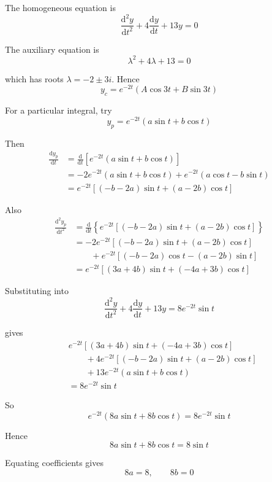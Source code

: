 \documentclass[leqno]{article}
\begin{document}
\begin{enumerate}[
  label=\textbf{\arabic*.},
  leftmargin=*,
  topsep=0pt,
  partopsep=0pt,
  parsep=0pt
]
\vspace*{10pt}

\begin{djsSolution}
The homogeneous equation is
\[
\frac{\mathrm{d}^2 y}{\mathrm{d}t^2}+4\frac{\mathrm{d}y}{\mathrm{d}t}+13y=0
\]

The auxiliary equation is
\[
\lambda^2+4\lambda+13=0
\]

which has roots $\lambda=-2\pm 3i$. Hence
\[
y_c=e^{-2t}\left(A\cos 3t+B\sin 3t\right)
\]

For a particular integral, try
\[
y_p=e^{-2t}\left(a\sin t+b\cos t\right)
\]

Then
\begin{align*}
\frac{\mathrm{d}y_p}{\mathrm{d}t}
&= \frac{\mathrm{d}}{\mathrm{d}t}\left[e^{-2t}\left(a\sin t+b\cos t\right)\right] \\
&= -2e^{-2t}\left(a\sin t+b\cos t\right)
+e^{-2t}\left(a\cos t-b\sin t\right) \\
&= e^{-2t}\left[(-b-2a)\sin t+(a-2b)\cos t\right]
\end{align*}

Also
\begin{align*}
\frac{\mathrm{d}^2y_p}{\mathrm{d}t^2}
&= \frac{\mathrm{d}}{\mathrm{d}t}\left\{e^{-2t}\left[(-b-2a)\sin t+(a-2b)\cos t\right]\right\} \\
&= -2e^{-2t}\left[(-b-2a)\sin t+(a-2b)\cos t\right] \\
&\qquad +e^{-2t}\left[(-b-2a)\cos t-(a-2b)\sin t\right] \\
&= e^{-2t}\left[(3a+4b)\sin t+(-4a+3b)\cos t\right]
\end{align*}

Substituting into
\[
\frac{\mathrm{d}^2 y}{\mathrm{d}t^2}+4\frac{\mathrm{d}y}{\mathrm{d}t}+13y=8e^{-2t}\sin t
\]

gives
\begin{align*}
& e^{-2t}\left[(3a+4b)\sin t+(-4a+3b)\cos t\right] \\
& \qquad +4e^{-2t}\left[(-b-2a)\sin t+(a-2b)\cos t\right] \\
& \qquad +13e^{-2t}\left(a\sin t+b\cos t\right) \\
&= 8e^{-2t}\sin t
\end{align*}

So
\[
e^{-2t}\left(8a\sin t+8b\cos t\right)=8e^{-2t}\sin t
\]

Hence
\[
8a\sin t+8b\cos t=8\sin t
\]

Equating coefficients gives
\[
8a=8, \qquad 8b=0
\]


\end{djsSolution}
\end{enumerate}
\end{document}
